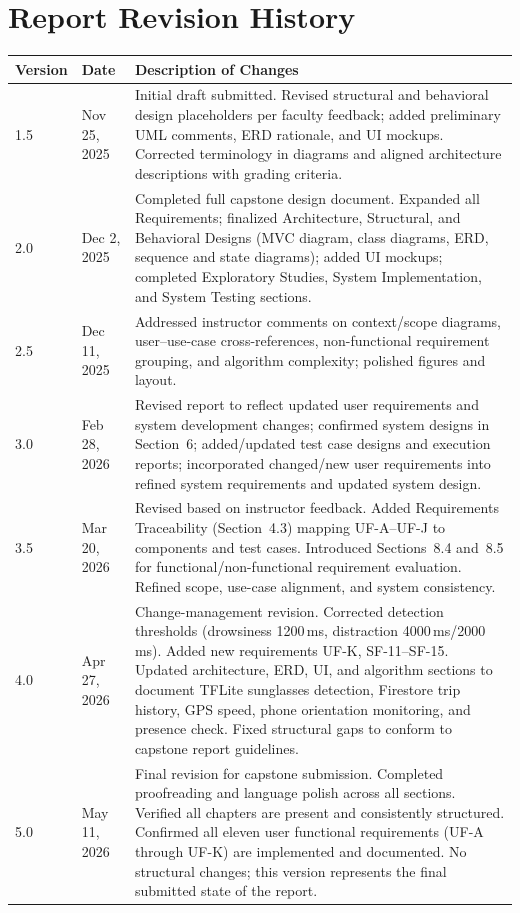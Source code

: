 \documentclass[11pt]{report}
\begin{document}
\chapter{Report Revision History}

\begin{center}
\begin{tabular}{p{1.8cm} p{2.6cm} p{10.6cm}}
\toprule
\textbf{Version} & \textbf{Date} & \textbf{Description of Changes} \\
\midrule
1.5 & Nov 25, 2025 & Initial draft submitted. Revised structural and behavioral design placeholders per faculty feedback; added preliminary UML comments, ERD rationale, and UI mockups. Corrected terminology in diagrams and aligned architecture descriptions with grading criteria. \\[6pt]
2.0 & Dec 2, 2025  & Completed full capstone design document. Expanded all Requirements; finalized Architecture, Structural, and Behavioral Designs (MVC diagram, class diagrams, ERD, sequence and state diagrams); added UI mockups; completed Exploratory Studies, System Implementation, and System Testing sections. \\[6pt]
2.5 & Dec 11, 2025 & Addressed instructor comments on context/scope diagrams, user--use-case cross-references, non-functional requirement grouping, and algorithm complexity; polished figures and layout. \\[6pt]
3.0 & Feb 28, 2026 & Revised report to reflect updated user requirements and system development changes; confirmed system designs in Section~6; added/updated test case designs and execution reports; incorporated changed/new user requirements into refined system requirements and updated system design. \\[6pt]
3.5 & Mar 20, 2026 & Revised based on instructor feedback. Added Requirements Traceability (Section~4.3) mapping UF-A--UF-J to components and test cases. Introduced Sections~8.4 and~8.5 for functional/non-functional requirement evaluation. Refined scope, use-case alignment, and system consistency. \\[6pt]
4.0 & Apr 27, 2026 & Change-management revision. Corrected detection thresholds (drowsiness 1200\,ms, distraction 4000\,ms/2000\,ms). Added new requirements UF-K, SF-11--SF-15. Updated architecture, ERD, UI, and algorithm sections to document TFLite sunglasses detection, Firestore trip history, GPS speed, phone orientation monitoring, and presence check. Fixed structural gaps to conform to capstone report guidelines. \\[6pt]
5.0 & May 11, 2026 & Final revision for capstone submission. Completed proofreading and language polish across all sections. Verified all chapters are present and consistently structured. Confirmed all eleven user functional requirements (UF-A through UF-K) are implemented and documented. No structural changes; this version represents the final submitted state of the report. \\
\bottomrule
\end{tabular}
\end{center}
\end{document}
